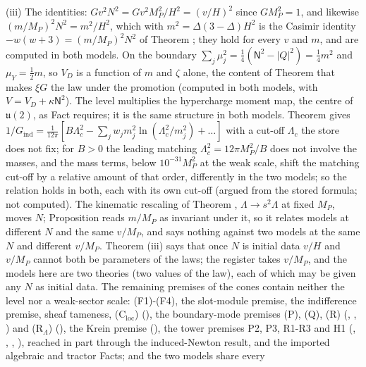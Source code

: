 (iii) The identities: $Gv^{2}N^{2} = Gv^{2}M_{P}^{2}/H^{2} = (v/H)^{2}$ since $GM_{P}^{2} = 1$, and likewise $(m/M_{P})^{2}N^{2} = m^{2}/H^{2}$, which with $m^{2} = \Delta(3 - \Delta)H^{2}$ is the Casimir identity $-w(w + 3) = (m/M_{P})^{2}N^{2}$ of Theorem ; they hold for every $v$ and $m$, and are computed in both models. On the boundary $\sum_{j}\mu_{j}^{2} = \tfrac14(\mathsf{N}^{2} - |Q|^{2}) = \tfrac14 m^{2}$ and $\mu_{Y} = \tfrac12 m$, so $V_{D}$ is a function of $m$ and $\zeta$ alone, the content of Theorem  that makes $\xi G$ the law under the promotion (computed in both models, with $V = V_{D} + \kappa\mathsf{N}^{2}$). The level multiplies the hypercharge moment map, the centre of $\mathfrak{u}(2)$, as Fact  requires; it is the same structure in both models. Theorem  gives $1/G_{\mathrm{ind}} = \tfrac{1}{12\pi}[B\Lambda_{c}^{2} - \sum_{j}w_{j}m_{j}^{2}\ln(\Lambda_{c}^{2}/m_{j}^{2}) + \dots]$ with a cut-off $\Lambda_{c}$ the store does not fix; for $B > 0$ the leading matching $\Lambda_{c}^{2} = 12\pi M_{P}^{2}/B$ does not involve the masses, and the mass terms, below $10^{-31}M_{P}^{2}$ at the weak scale, shift the matching cut-off by a relative amount of that order, differently in the two models; so the relation holds in both, each with its own cut-off (argued from the stored formula; not computed). The kinematic rescaling of Theorem , $\Lambda \to s^{2}\Lambda$ at fixed $M_{P}$, moves $N$; Proposition  reads $m/M_{P}$ as invariant under it, so it relates models at different $N$ and the same $v/M_{P}$, and says nothing against two models at the same $N$ and different $v/M_{P}$. Theorem (iii) says that once $N$ is initial data $v/H$ and $v/M_{P}$ cannot both be parameters of the laws; the register takes $v/M_{P}$, and the models here are two theories (two values of the law), each of which may be given any $N$ as initial data. The remaining premises of the cones contain neither the level nor a weak-sector scale: (F1)-(F4), the slot-module premise, the indifference premise, sheaf tameness, (C$_{\mathrm{loc}}$) (), the boundary-mode premises (P), (Q), (R) (, , ) and (R$_{\Lambda}$) (), the Krein premise (), the tower premises P2, P3, R1-R3 and H1 (, , , ), reached in part through the induced-Newton result, and the imported algebraic and tractor Facts; and the two models share every 